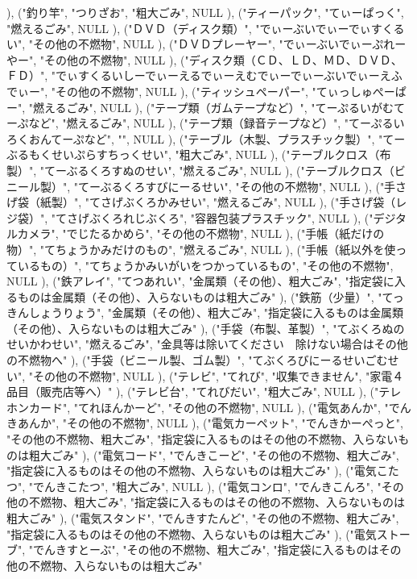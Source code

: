 ), ("釣り竿", "つりざお", "粗大ごみ", NULL
), ("ティーパック", "てぃーぱっく", "燃えるごみ", NULL
), ("ＤＶＤ（ディスク類）", "でぃーぶいでぃーでぃすくるい", "その他の不燃物", NULL
), ("ＤＶＤプレーヤー", "でぃーぶいでぃーぷれーやー", "その他の不燃物", NULL
), ("ディスク類（ＣＤ、ＬＤ、ＭＤ、ＤＶＤ、ＦＤ）", "でぃすくるいしーでぃーえるでぃーえむでぃーでぃーぶいでぃーえふでぃー", "その他の不燃物", NULL
), ("ティッシュペーパー", "てぃっしゅぺーぱー", "燃えるごみ", NULL
), ("テープ類（ガムテープなど）", "てーぷるいがむてーぷなど", "燃えるごみ", NULL
), ("テープ類（録音テープなど）", "てーぷるいろくおんてーぷなど", "", NULL
), ("テーブル（木製、プラスチック製）", "てーぶるもくせいぷらすちっくせい", "粗大ごみ", NULL
), ("テーブルクロス（布製）", "てーぶるくろすぬのせい", "燃えるごみ", NULL
), ("テーブルクロス（ビニール製）", "てーぶるくろすびにーるせい", "その他の不燃物", NULL
), ("手さげ袋（紙製）", "てさげぶくろかみせい", "燃えるごみ", NULL
), ("手さげ袋（レジ袋）", "てさげぶくろれじぶくろ", "容器包装プラスチック", NULL
), ("デジタルカメラ", "でじたるかめら", "その他の不燃物", NULL
), ("手帳（紙だけの物）", "てちょうかみだけのもの", "燃えるごみ", NULL
), ("手帳（紙以外を使っているもの）", "てちょうかみいがいをつかっているもの", "その他の不燃物", NULL
), ("鉄アレイ", "てつあれい", "金属類（その他）、粗大ごみ", "指定袋に入るものは金属類（その他）、入らないものは粗大ごみ"
), ("鉄筋（少量）", "てっきんしょうりょう", "金属類（その他）、粗大ごみ", "指定袋に入るものは金属類（その他）、入らないものは粗大ごみ"
), ("手袋（布製、革製）", "てぶくろぬのせいかわせい", "燃えるごみ", "金具等は除いてください　除けない場合はその他の不燃物へ"
), ("手袋（ビニール製、ゴム製）", "てぶくろびにーるせいごむせい", "その他の不燃物", NULL
), ("テレビ", "てれび", "収集できません", "家電４品目（販売店等へ）"
), ("テレビ台", "てれびだい", "粗大ごみ", NULL
), ("テレホンカード", "てれほんかーど", "その他の不燃物", NULL
), ("電気あんか", "でんきあんか", "その他の不燃物", NULL
), ("電気カーペット", "でんきかーぺっと", "その他の不燃物、粗大ごみ", "指定袋に入るものはその他の不燃物、入らないものは粗大ごみ"
), ("電気コード", "でんきこーど", "その他の不燃物、粗大ごみ", "指定袋に入るものはその他の不燃物、入らないものは粗大ごみ"
), ("電気こたつ", "でんきこたつ", "粗大ごみ", NULL
), ("電気コンロ", "でんきこんろ", "その他の不燃物、粗大ごみ", "指定袋に入るものはその他の不燃物、入らないものは粗大ごみ"
), ("電気スタンド", "でんきすたんど", "その他の不燃物、粗大ごみ", "指定袋に入るものはその他の不燃物、入らないものは粗大ごみ"
), ("電気ストーブ", "でんきすとーぶ", "その他の不燃物、粗大ごみ", "指定袋に入るものはその他の不燃物、入らないものは粗大ごみ"
